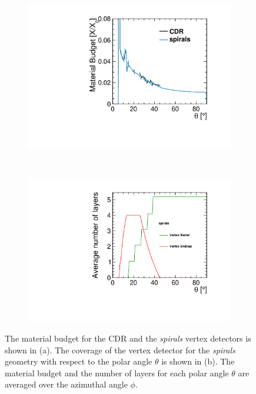 \begin{figure}[H]
  \begin{subfigure}[b]{0.5\textwidth}
    \centering
    \includegraphics[scale=0.4]{Figures/Geometries/material_budget_spirals.pdf}
    \caption{}\label{fig:materialBudgSpiralEndcap}
  \end{subfigure}~
  \begin{subfigure}[b]{0.5\textwidth}
    \centering
    \includegraphics[scale=0.4]{Figures/Geometries/nb_layer_spirals.pdf}
    \caption{}\label{fig:spiral_nb_barrel_endcap}
  \end{subfigure}
  \caption{The material budget for the CDR and the {\it spirals} vertex detectors is shown in (a). The coverage of the vertex detector for the {\it spirals} geometry with respect to the polar angle $\theta$ is shown in (b). The material budget and the number of layers for each polar angle $\theta$ are averaged over the azimuthal angle $\phi$.}
\end{figure}


